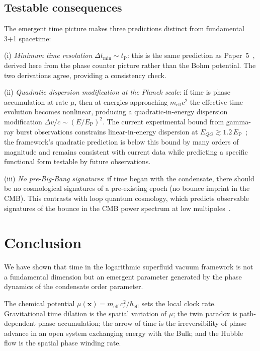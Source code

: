 \documentclass[12pt, a4paper]{article}
\newcommand{\meff}{m_{\mathrm{eff}}}
\newcommand{\heff}{\hbar_{\mathrm{eff}}}
\newcommand{\tP}{t_{\mathrm{P}}}
\begin{document}
\subsection{Testable consequences}

The emergent time picture makes three predictions
distinct from fundamental 3+1 spacetime:

(i) \emph{Minimum time resolution} $\Delta t_{\min}
\sim \tP$: this is the same prediction as
Paper~5~\cite{kulangiev_2026e}, derived here from
the phase counter picture rather than the Bohm
potential. The two derivations agree, providing a
consistency check.

(ii) \emph{Quadratic dispersion modification at the Planck scale}:
if time is phase accumulation at rate $\mu$, then
at energies approaching $\meff c^2$ the effective
time evolution becomes nonlinear, producing a
quadratic-in-energy dispersion modification
$\Delta v/c \sim (E/E_{\mathrm{P}})^2$. The current
experimental bound from gamma-ray burst observations
constrains linear-in-energy dispersion at $E_{QG}
\gtrsim 1.2\,E_{\mathrm{P}}$~\cite{amelino_2013};
the framework's quadratic prediction is below this
bound by many orders of magnitude and remains
consistent with current data while predicting a
specific functional form testable by future
observations.

(iii) \emph{No pre-Big-Bang signatures}: if time
began with the condensate, there should be no
cosmological signatures of a pre-existing epoch
(no bounce imprint in the CMB). This contrasts
with loop quantum cosmology, which predicts
observable signatures of the bounce in the CMB
power spectrum at low multipoles~\cite{bojowald_calcagni_tsujikawa_2011}.


\section{Conclusion}
\label{sec:conclusion}

We have shown that time in the logarithmic superfluid
vacuum framework is not a fundamental dimension but
an emergent parameter generated by the phase dynamics
of the condensate order parameter.

The chemical potential $\mu(\mathbf{x}) =
\meff\,c_s^2/\heff$ sets the local clock rate.
Gravitational time dilation is the spatial variation
of $\mu$; the twin paradox is path-dependent phase
accumulation; the arrow of time is the irreversibility
of phase advance in an open system exchanging energy
with the Bulk; and the Hubble flow is the spatial
phase winding rate.
\end{document}
